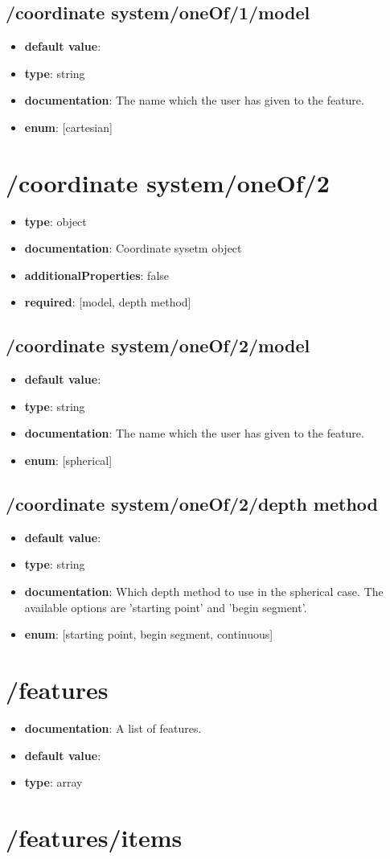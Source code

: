 \subsection{/coordinate system/oneOf/1/model}
\begin{itemize}\item {\bf default value}: 
\item {\bf type}: string
\item {\bf documentation}: The name which the user has given to the feature.
\item {\bf enum}: [cartesian]\end{itemize}\section{/coordinate system/oneOf/2}
\begin{itemize}\item {\bf type}: object
\item {\bf documentation}: Coordinate sysetm object
\item {\bf additionalProperties}: false
\item {\bf required}: [model, depth method]\end{itemize}
\subsection{/coordinate system/oneOf/2/model}
\begin{itemize}\item {\bf default value}: 
\item {\bf type}: string
\item {\bf documentation}: The name which the user has given to the feature.
\item {\bf enum}: [spherical]\end{itemize}\subsection{/coordinate system/oneOf/2/depth method}
\begin{itemize}\item {\bf default value}: 
\item {\bf type}: string
\item {\bf documentation}: Which depth method to use in the spherical case. The available options are 'starting point' and 'begin segment'.
\item {\bf enum}: [starting point, begin segment, continuous]\end{itemize}\section{/features}
\begin{itemize}\item {\bf documentation}: A list of features.
\item {\bf default value}: 
\item {\bf type}: array
\end{itemize}\section{/features/items}

